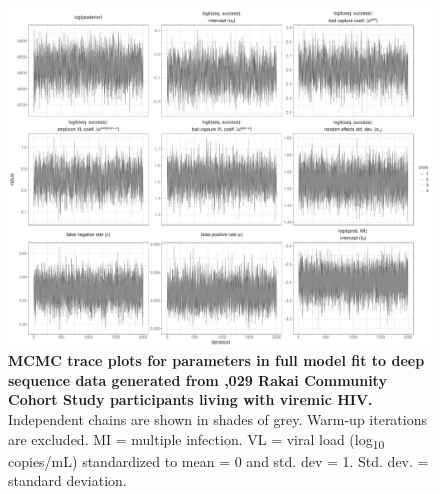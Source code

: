 \documentclass[10pt,letterpaper]{article}
\begin{document}
\begin{figure}[!ht]
 \includegraphics[width=1\textwidth]{../../figures/empirical_full_trace.pdf}
\caption{{\bf MCMC trace plots for parameters in full model fit to deep sequence data generated from ,029 Rakai Community Cohort Study participants living with viremic HIV.} Independent chains are shown in shades of grey. Warm-up iterations are excluded. MI = multiple infection. VL = viral load (log\textsubscript{10} copies/mL) standardized to mean = 0 and std. dev = 1. Std. dev. = standard deviation. }
\end{figure}
\end{document}
